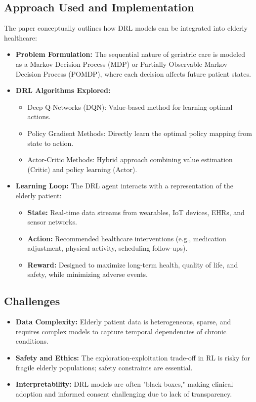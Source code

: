 \subsection*{Approach Used and Implementation}
The paper conceptually outlines how DRL models can be integrated into elderly healthcare:
\begin{itemize}
    \item \textbf{Problem Formulation:} The sequential nature of geriatric care is modeled as a Markov Decision Process (MDP) or Partially Observable Markov Decision Process (POMDP), where each decision affects future patient states.
    \item \textbf{DRL Algorithms Explored:}
    \begin{itemize}
        \item Deep Q-Networks (DQN): Value-based method for learning optimal actions.
        \item Policy Gradient Methods: Directly learn the optimal policy mapping from state to action.
        \item Actor-Critic Methods: Hybrid approach combining value estimation (Critic) and policy learning (Actor).
    \end{itemize}
    \item \textbf{Learning Loop:} The DRL agent interacts with a representation of the elderly patient:
    \begin{itemize}
        \item \textbf{State:} Real-time data streams from wearables, IoT devices, EHRs, and sensor networks.
        \item \textbf{Action:} Recommended healthcare interventions (e.g., medication adjustment, physical activity, scheduling follow-ups).
        \item \textbf{Reward:} Designed to maximize long-term health, quality of life, and safety, while minimizing adverse events.
    \end{itemize}
\end{itemize}

\subsection*{Challenges}
\begin{itemize}
    \item \textbf{Data Complexity:} Elderly patient data is heterogeneous, sparse, and requires complex models to capture temporal dependencies of chronic conditions.
    \item \textbf{Safety and Ethics:} The exploration-exploitation trade-off in RL is risky for fragile elderly populations; safety constraints are essential.
    \item \textbf{Interpretability:} DRL models are often "black boxes," making clinical adoption and informed consent challenging due to lack of transparency.
\end{itemize}

